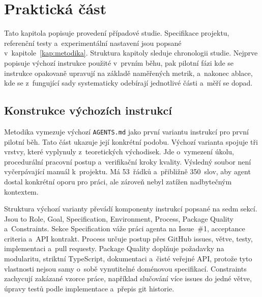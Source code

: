 \chapter{Praktická část}
\label{kap:prakticka-cast}


\newcommand{\cmark}{\cellcolor{cGood}\checkmark}
\newcommand{\xmark}{\cellcolor{cBad}$\times$}
\newcommand{\cgood}[1]{\cellcolor{cGood}#1}
\newcommand{\cmid}[1]{\cellcolor{cMid}#1}
\newcommand{\cbad}[1]{\cellcolor{cBad}#1}
\newcommand{\cna}[1]{\cellcolor{cNeutral}#1}

Tato kapitola popisuje provedení případové studie. Specifikace
projektu, referenční testy a~experimentální nastavení jsou popsané
v~kapitole~\ref{kap:metodika}. Struktura kapitoly sleduje chronologii
studie. Nejprve popisuje výchozí instrukce použité v~prvním běhu, pak pilotní fázi
kde se instrukce opakovaně upravují na základě naměřených metrik,
a~nakonec ablace, kde se z~fungující sady systematicky odebírají
jednotlivé části a~měří se dopad.


\section{Konstrukce výchozích instrukcí}
\label{sec:konstrukce-instrukci}

Metodika vymezuje výchozí \texttt{AGENTS.md} jako první variantu
instrukcí pro první pilotní běh. Tato část ukazuje její konkrétní
podobu. Výchozí varianta spojuje tři vrstvy, které vyplynuly z~teoretických
východisek. Jde o~vymezení úkolu, procedurální pracovní postup
a~verifikační kroky kvality. Výsledný soubor není vyčerpávající
manuál k~projektu. Má 53~řádků a~přibližně 350~slov, aby agent dostal
konkrétní oporu pro práci, ale zároveň nebyl zatížen nadbytečným
kontextem.

Struktura výchozí varianty převádí komponenty instrukcí popsané
\textcite{mao2025fse} na sedm sekcí. Jsou to Role, Goal,
Specification, Environment, Process, Package Quality a~Constraints.
Sekce Specification váže práci agenta na Issue~\#1, acceptance criteria
a~API kontrakt. Process určuje postup přes GitHub issues, větve,
testy, implementaci a~pull requesty. Package Quality doplňuje
požadavky na modularitu, striktní TypeScript, dokumentaci a~čisté
veřejné API, protože tyto vlastnosti nejsou samy o~sobě vynutitelné
doménovou specifikací. Constraints zachycují zakázané vzorce práce,
například slučování více issues do jedné větve, úpravy testů podle
implementace a~přepis git historie.

